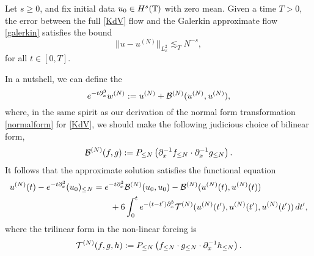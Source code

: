 \begin{proposition}
    Let $s \geq 0$, and fix initial data $u_0 \in H^s (\mathbb T)$ with zero mean. Given a time $T > 0$, the error between the full \eqref{KdV} flow and the Galerkin approximate flow \eqref{galerkin} satisfies the bound 
        \begin{equation}
            ||u - u^{(N)} ||_{L^2_x} 
                \lesssim_T N^{-s},
        \end{equation}
    for all $t \in [0, T]$. 
\end{proposition}

In a nutshell, we can define the 
    \begin{equation}\label{eq:normalformG}
        e^{-t \partial_x^3} w^{(N)}
            := u^{(N)} + \mathcal B^{(N)} (u^{(N)}, u^{(N)}),
    \end{equation}
where, in the same spirit as our derivation of the normal form transformation \eqref{normalform} for \eqref{KdV}, we should make the following judicious choice of bilinear form,
    \[
        \mathcal B^{(N)} (f, g) 
            := P_{\leq N} \left( \partial_x^{-1} f_{\leq N}\cdot \partial_x^{-1} g_{\leq N} \right). 
    \]
It follows that the approximate solution satisfies the functional equation
    \begin{equation}\label{eq:integral2}
        \begin{split}
        u^{(N)}(t) - e^{-t \partial_x^3} (u_0)_{\leq N}
            &= e^{-t \partial_x^3} \mathcal B^{(N)} (u_0, u_0) - \mathcal B^{(N)} (u^{(N)} (t), u^{(N)}(t)) \\
            &\qquad+ 6 \int_0^t e^{-(t - t') \partial_x^3} \mathcal T^{(N)} (u^{(N)}(t'), u^{(N)}(t'), u^{(N)}(t'))\, dt' ,
        \end{split}
    \end{equation}
where the trilinear form in the non-linear forcing is 
    \[
        \mathcal T^{(N)}( f, g, h) 
            := P_{\leq N} \left( f_{\leq N} \cdot g_{\leq N} \cdot \partial_x^{-1} h_{\leq N} \right) . 
    \]

